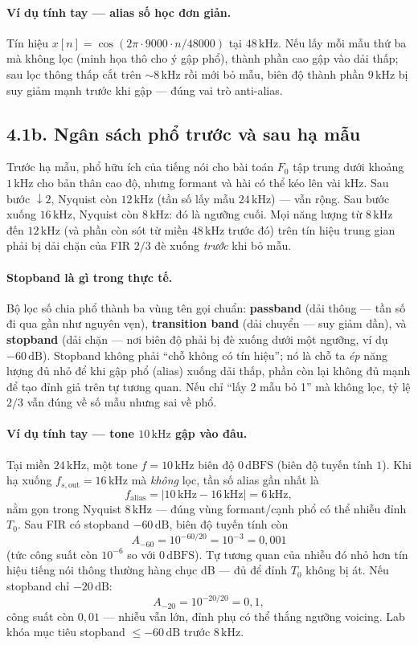 \paragraph{Ví dụ tính tay --- alias số học đơn giản.} Tín hiệu $x[n]=\cos(2\pi\cdot 9000\cdot n/48000)$ tại $48\,\text{kHz}$. Nếu lấy mỗi mẫu thứ ba mà không lọc (minh họa thô cho ý gập phổ), thành phần cao gập vào dải thấp; sau lọc thông thấp cắt trên $\sim 8\,\text{kHz}$ rồi mới bỏ mẫu, biên độ thành phần $9\,\text{kHz}$ bị suy giảm mạnh trước khi gập --- đúng vai trò anti-alias.


\subsection*{4.1b. Ngân sách phổ trước và sau hạ mẫu}

Trước hạ mẫu, phổ hữu ích của tiếng nói cho bài toán $F_0$ tập trung dưới khoảng $1\,\text{kHz}$ cho bản thân cao độ, nhưng formant và hài có thể kéo lên vài kHz. Sau bước $\downarrow 2$, Nyquist còn $12\,\text{kHz}$ (tần số lấy mẫu $24\,\text{kHz}$) --- vẫn rộng. Sau bước xuống $16\,\text{kHz}$, Nyquist còn $8\,\text{kHz}$: đó là ngưỡng cuối. Mọi năng lượng từ $8\,\text{kHz}$ đến $12\,\text{kHz}$ (và phần còn sót từ miền $48\,\text{kHz}$ trước đó) trên tín hiệu trung gian phải bị dải chặn của FIR $2/3$ đè xuống \emph{trước} khi bỏ mẫu.

\paragraph{Stopband là gì trong thực tế.} Bộ lọc số chia phổ thành ba vùng tên gọi chuẩn: \textbf{passband} (dải thông --- tần số đi qua gần như nguyên vẹn), \textbf{transition band} (dải chuyển --- suy giảm dần), và \textbf{stopband} (dải chặn --- nơi biên độ phải bị đè xuống dưới một ngưỡng, ví dụ $-60\,\text{dB}$). Stopband không phải ``chỗ không có tín hiệu''; nó là chỗ ta \emph{ép} năng lượng đủ nhỏ để khi gập phổ (alias) xuống dải thấp, phần còn lại không đủ mạnh để tạo đỉnh giả trên tự tương quan. Nếu chỉ ``lấy 2 mẫu bỏ 1'' mà không lọc, tỷ lệ $2/3$ vẫn đúng về số mẫu nhưng sai về phổ.

\paragraph{Ví dụ tính tay --- tone $10\,\text{kHz}$ gập vào đâu.} Tại miền $24\,\text{kHz}$, một tone $f=10\,\text{kHz}$ biên độ $0\,\text{dBFS}$ (biên độ tuyến tính $1$). Khi hạ xuống $f_{s,\mathrm{out}}=16\,\text{kHz}$ mà \emph{không} lọc, tần số alias gần nhất là
\[
f_{\mathrm{alias}}=\lvert 10\,\text{kHz}-16\,\text{kHz}\rvert=6\,\text{kHz},
\]
nằm gọn trong Nyquist $8\,\text{kHz}$ --- đúng vùng formant/cạnh phổ có thể nhiễu đỉnh $T_0$. Sau FIR có stopband $-60\,\text{dB}$, biên độ tuyến tính còn
\[
A_{-60}=10^{-60/20}=10^{-3}=0{,}001
\]
(tức công suất còn $10^{-6}$ so với $0\,\text{dBFS}$). Tự tương quan của nhiễu đó nhỏ hơn tín hiệu tiếng nói thông thường hàng chục dB --- đủ để đỉnh $T_0$ không bị át. Nếu stopband chỉ $-20\,\text{dB}$:
\[
A_{-20}=10^{-20/20}=0{,}1,
\]
công suất còn $0{,}01$ --- nhiễu vẫn lớn, đỉnh phụ có thể thắng ngưỡng voicing. Lab khóa mục tiêu stopband $\le -60\,\text{dB}$ trước $8\,\text{kHz}$.

